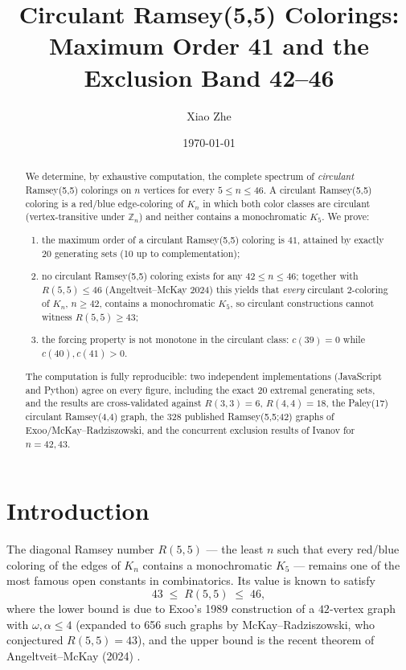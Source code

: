 \documentclass[11pt]{article}
\title{\bf Circulant Ramsey(5,5) Colorings:\\ Maximum Order 41 and the Exclusion Band 42--46}
\author{Xiao Zhe} %
\date{\today}
\theoremstyle{remark}
\begin{document}
\maketitle

\begin{abstract}
We determine, by exhaustive computation, the complete spectrum of \emph{circulant}
Ramsey(5,5) colorings on $n$ vertices for every $5\le n\le 46$. A circulant Ramsey(5,5)
coloring is a red/blue edge-coloring of $K_n$ in which both color classes are circulant
(vertex-transitive under $\mathbb{Z}_n$) and neither contains a monochromatic $K_5$. We prove:
\begin{enumerate}
\item the maximum order of a circulant Ramsey(5,5) coloring is $41$, attained by exactly
      $20$ generating sets (10 up to complementation);
\item no circulant Ramsey(5,5) coloring exists for any $42\le n\le 46$; together with
      $R(5,5)\le46$ (Angeltveit--McKay 2024) this yields that \emph{every} circulant
      $2$-coloring of $K_n$, $n\ge42$, contains a monochromatic $K_5$, so circulant
      constructions cannot witness $R(5,5)\ge43$;
\item the forcing property is not monotone in the circulant class: $c(39)=0$ while
      $c(40),c(41)>0$.
\end{enumerate}
The computation is fully reproducible: two independent implementations (JavaScript and
Python) agree on every figure, including the exact $20$ extremal generating sets, and the
results are cross-validated against $R(3,3)=6$, $R(4,4)=18$, the Paley(17) circulant
Ramsey(4,4) graph, the $328$ published Ramsey(5,5;42) graphs of Exoo/McKay--Radziszowski,
and the concurrent exclusion results of Ivanov for $n=42,43$.
\end{abstract}

\section{Introduction}\label{sec:intro}
The diagonal Ramsey number $R(5,5)$ --- the least $n$ such that every red/blue coloring of
the edges of $K_n$ contains a monochromatic $K_5$ --- remains one of the most famous open
constants in combinatorics. Its value is known to satisfy
\begin{equation}\label{eq:bounds}
43\;\le\;R(5,5)\;\le\;46,
\end{equation}
where the lower bound is due to Exoo's 1989 construction of a $42$-vertex graph with
$\omega,\alpha\le4$ (expanded to 656 such graphs by McKay--Radziszowski, who conjectured
$R(5,5)=43$), and the upper bound is the recent theorem of Angeltveit--McKay (2024)
\cite{am2024}.
\end{document}
